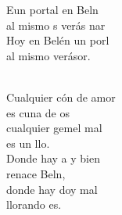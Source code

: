 \documentclass[12pt]{article}
\begin{document}
\begin{multicols*}{2}
\begin{cancion}[En un portal][]%
	\begin{chorus}%
	Eun portal  en Beln\\
	al mismo s verás nar \\
	Hoy en Belén un porl \\
	al mismo  verásor.\\
	\end{chorus}%
	\jump\\
	Cualquier cón de amor\\
	es cuna de os\\
	cualquier gemel mal\\
	es un llo.\\
\jump
	Donde hay a y bien\\
	renace Beln,\\
	donde hay doy mal\\
	llorando es.\\
\end{cancion}%


\end{multicols*}
\end{document}
